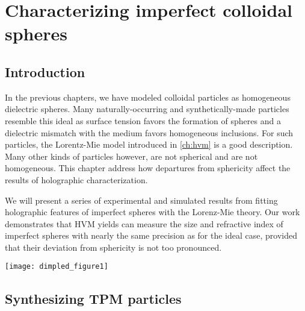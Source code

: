 \chapter{Characterizing imperfect colloidal spheres}
\label{ch:dimpled}

\section{Introduction}
In the previous chapters, we have modeled colloidal particles as homogeneous
dielectric spheres. Many naturally-occurring and synthetically-made particles
resemble this ideal as surface tension favors the formation of spheres and a dielectric
mismatch with the medium favors homogeneous inclusions.
For such particles, the Lorentz-Mie model introduced in \autoref{ch:hvm} is a
good description. Many other kinds of particles however, are not spherical and
are not homogeneous. This chapter address how departures from sphericity
affect the results of holographic characterization.

We will present a series of experimental and simulated results from fitting
holographic features of imperfect spheres with the Lorenz-Mie theory.
Our work demonstrates that HVM yields can measure the size and refractive index
of imperfect spheres with nearly the same precision as for the ideal
case, provided that their
deviation from sphericity is not too pronounced. 

\begin{figure*}[t]
  \centering
  \texttt{[image: dimpled\_figure1]}
  \caption{(a) Scanning electron micrograph of a colloidal TPM sphere and 
    (b) a dimpled sphere.  Scale bars represent \SI{500}{\nm}.
    (c) and (d) Corresponding holograms for
    particles from the samples show in (a) and (b).  (e) \num{5000} measurements
    of sphere radius and refractive index for a single
    TPM sphere held in an optical tweezer.  Each point represents
    a single measurement, and is colored according to the
    relative density of measurements, $P(a_p,n_p)$.  (f) equivalent result for
    a dimpled sphere.  (g) \num{5000} measurements of the radius and
    refractive index of a freely diffusing sphere.  (h) Equivalent
    result for a dimpled sphere.
   }
  \label{fig:singleparticle}
\end{figure*}

\section{Synthesizing TPM particles}


